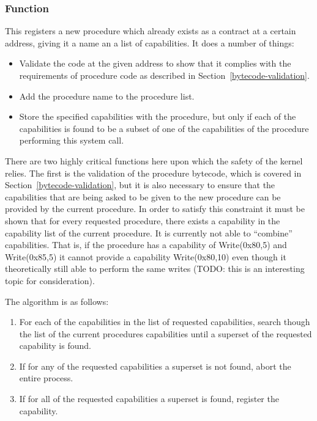 \documentclass[english,a4paper]{article}
\let\oldparagraph\subsubsection
\renewcommand{\subsubsection}[1]{\oldparagraph{#1}\mbox{}}
\begin{document}
\subsubsection{Function}
This registers a new procedure which already exists as a contract at a certain
address, giving it a name an a list of capabilities. It does a number of things:

\begin{itemize}
  \item Validate the code at the given address to show that it complies with the
  requirements of procedure code as described in
  Section~\ref{bytecode-validation}.
  \item Add the procedure name to the procedure list.
  \item Store the specified capabilities with the procedure, but only if each of
  the capabilities is found to be a subset of one of the capabilities of the
  procedure performing this system call.
\end{itemize}

There are two highly critical functions here upon which the safety of the kernel
relies. The first is the validation of the procedure bytecode, which is covered
in Section~\ref{bytecode-validation}, but it is also necessary to ensure that
the capabilities that are being asked to be given to the new procedure can be
provided by the current procedure. In order to satisfy this constraint it must
be shown that for every requested procedure, there exists a capability in the
capability list of the current procedure. It is currently not able to
``combine'' capabilities. That is, if the procedure has a capability of
Write(0x80,5) and Write(0x85,5) it cannot provide a capability Write(0x80,10)
even though it theoretically still able to perform the same writes (TODO: this
is an interesting topic for consideration).

The algorithm is as follows:

\begin{enumerate}
  \item For each of the capabilities in the list of requested capabilities,
  search though the list of the current procedures capabilities until a superset
  of the requested capability is found.
  \item If for any of the requested capabilities a superset is not found, abort
  the entire process.
  \item If for all of the requested capabilities a superset is found, register
  the capability.
\end{enumerate}
\end{document}
